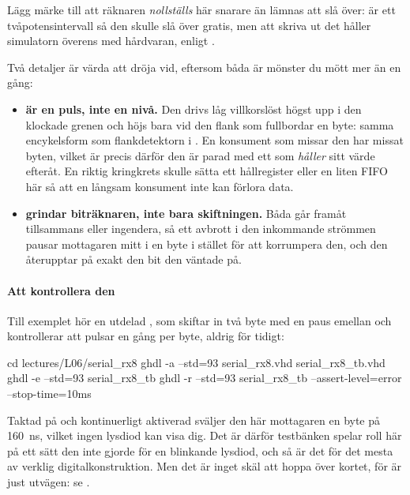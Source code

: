 Lägg märke till att räknaren \emph{nollställs} här snarare än lämnas att slå över:  är
ett tvåpotensintervall så den skulle slå över gratis, men att skriva ut det håller simulatorn
överens med hårdvaran, enligt .

Två detaljer är värda att dröja vid, eftersom båda är mönster du mött mer än en gång:
\begin{itemize}
  \item \textbf{ är en puls, inte en nivå.} Den drivs låg villkorslöst högst upp i
    den klockade grenen och höjs bara vid den flank som fullbordar en byte: samma encykelsform som
    flankdetektorn i . En konsument som missar den har missat byten, vilket är
    precis därför den är parad med ett  som \emph{håller} sitt värde efteråt. En
    riktig kringkrets skulle sätta ett hållregister eller en liten FIFO här så att en långsam
    konsument inte kan förlora data.
  \item \textbf{ grindar biträknaren, inte bara skiftningen.} Båda går framåt
    tillsammans eller ingendera, så ett avbrott i den inkommande strömmen pausar mottagaren mitt i
    en byte i stället för att korrumpera den, och den återupptar på exakt den bit den väntade på.
\end{itemize}

\paragraph{Att kontrollera den}
Till exemplet hör en utdelad , som skiftar in två byte med en paus emellan
och kontrollerar att  pulsar en gång per byte, aldrig för tidigt:

\begin{shell}
cd lectures/L06/serial_rx8
ghdl -a --std=93 serial_rx8.vhd serial_rx8_tb.vhd
ghdl -e --std=93 serial_rx8_tb
ghdl -r --std=93 serial_rx8_tb --assert-level=error --stop-time=10ms
\end{shell}

Taktad på  och kontinuerligt aktiverad sväljer den här mottagaren en byte på 160~ns,
vilket ingen lysdiod kan visa dig. Det är därför testbänken spelar roll här på ett sätt den inte
gjorde för en blinkande lysdiod, och så är det för det mesta av verklig digitalkonstruktion. Men det
är inget skäl att hoppa över kortet, för  är just utvägen: se
.

